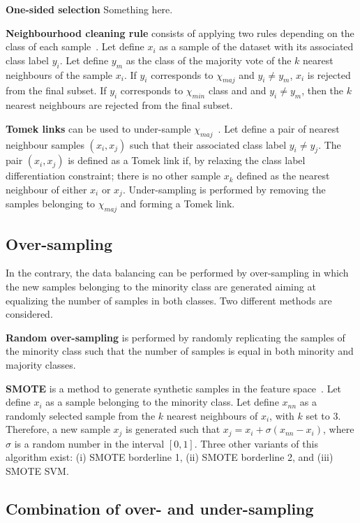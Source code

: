 \documentclass[twoside,11pt]{article}
\begin{document}
\textbf{One-sided selection} Something here.

\textbf{Neighbourhood cleaning rule} consists of applying two rules depending on the class of each sample~\citep{laurikkala2001improving}.
Let define $x_i$ as a sample of the dataset with its associated class label $y_i$.
Let define $y_m$ as the class of the majority vote of the $k$ nearest neighbours of the sample $x_i$.
If $y_i$ corresponds to $\chi_{maj}$ and $y_i \neq y_m$, $x_i$ is rejected from the final subset.
If $y_i$ corresponds to $\chi_{min}$ class and and $y_i \neq y_m$, then the $k$ nearest neighbours are rejected from the final subset.

\textbf{Tomek links} can be used to under-sample $\chi_{maj}$~\citep{tomek1976two}.
Let define a pair of nearest neighbour samples $(x_i, x_j)$ such that their associated class label $y_i \neq y_j$.
The pair $(x_i, x_j)$ is defined as a Tomek link if, by relaxing the class label differentiation constraint; there is no other sample $x_k$ defined as the nearest neighbour of either $x_i$ or $x_j$.
Under-sampling is performed by removing the samples belonging to $\chi_{maj}$ and forming a Tomek link.

\subsection{Over-sampling}

In the contrary, the data balancing can be performed by over-sampling in which the new samples belonging to the minority class are generated aiming at equalizing the number of samples in both classes.
Two different methods are considered.

\textbf{Random over-sampling} is performed by randomly replicating the samples of the minority class such that the number of samples is equal in both minority and majority classes.

\textbf{SMOTE} is a method to generate synthetic samples in the feature space~\citep{chawla2002smote}.
Let define $x_i$ as a sample belonging to the minority class.
Let define $x_{nn}$ as a randomly selected sample from the $k$ nearest neighbours of $x_i$, with $k$ set to 3.
Therefore, a new sample $x_j$ is generated such that $x_j = x_i + \sigma \left( x_{nn} - x_i \right)$, where $\sigma$ is a random number in the interval $\left[0,1\right]$.
Three other variants of this algorithm exist: (i) SMOTE borderline 1, (ii) SMOTE borderline 2, and (iii) SMOTE SVM.

\subsection{Combination of over- and under-sampling}
\end{document}
